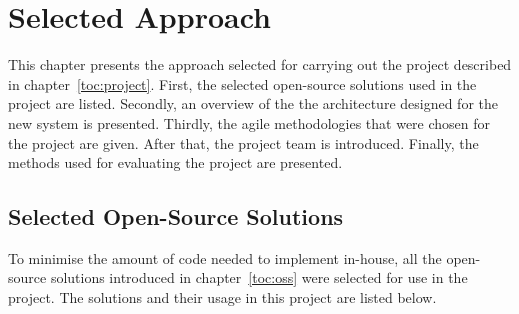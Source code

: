 \chapter{Selected Approach}
\label{toc:selected}

This chapter presents the approach selected for carrying out the 
project described in chapter~\ref{toc:project}. First, the selected 
open-source solutions used in the project are listed. Secondly, an 
overview of the the architecture designed for the new system is 
presented. Thirdly, the agile methodologies that were chosen for the 
project are given. After that, the project team is introduced. 
Finally, the methods used for evaluating the project are presented.


\section{Selected Open-Source Solutions}
\label{toc:selected:oss}

To minimise the amount of code needed to implement in-house, all the 
open-source solutions introduced in chapter~\ref{toc:oss} were 
selected for use in the project. The solutions and their usage in this 
project are listed below.

